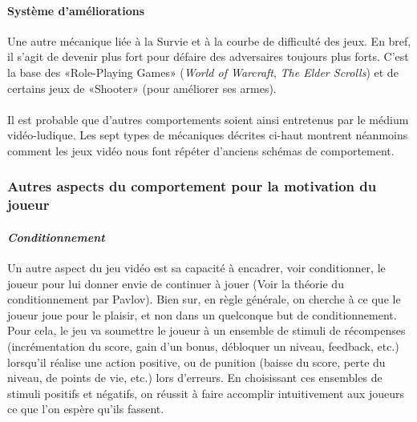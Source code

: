 		\paragraph{Système d’améliorations \\ \quad}
Une autre mécanique liée à la Survie et à la courbe de difficulté des jeux. En bref, il s’agit de devenir plus fort pour défaire des adversaires toujours plus forts. C’est la base des «Role-Playing Games» (\emph{World of Warcraft}, \emph{The Elder Scrolls}) et de certains jeux de «Shooter» (pour améliorer ses armes).

		\paragraph{}
Il est probable que d’autres comportements soient ainsi entretenus par le médium vidéo-ludique. Les sept types de mécaniques décrites ci-haut montrent néanmoins comment les jeux vidéo nous font répéter d’anciens schémas de comportement.

		\subsubsection*{Autres aspects du comportement pour la motivation du joueur}
			\paragraph{\emph{Conditionnement} \\ \quad}
Un autre aspect du jeu vidéo est sa capacité à encadrer, voir conditionner, le joueur pour lui donner envie de continuer à jouer (Voir la théorie du conditionnement par Pavlov). Bien sur, en règle générale, on cherche à ce que le joueur joue pour le plaisir, et non dans un quelconque but de conditionnement. Pour cela, le jeu va soumettre le joueur à un ensemble de stimuli de récompenses (incrémentation du score, gain d’un bonus, débloquer un niveau, feedback, etc.) lorsqu’il réalise une action positive, ou de punition (baisse du score, perte du niveau, de points de vie, etc.) lors d’erreurs. En choisissant ces ensembles de stimuli positifs et négatifs, on réussit à faire accomplir intuitivement aux joueurs ce que l’on espère qu’ils fassent.

